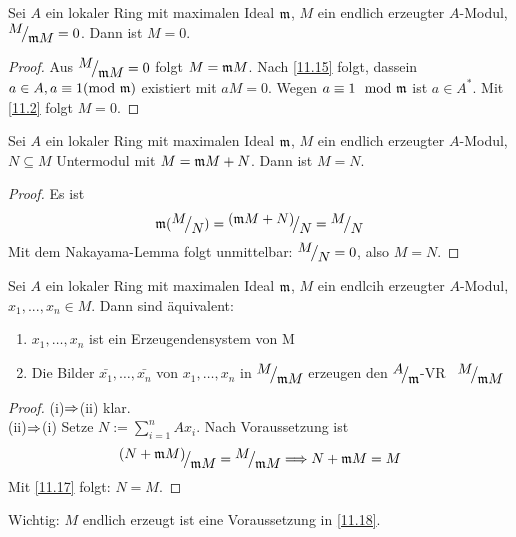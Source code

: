 \begin{sa} \label{11.16}
	Sei $ A $ ein lokaler Ring mit maximalen Ideal $\mathfrak{m}$, $M$ ein endlich erzeugter $A$-Modul, $ \QR{M}{\m M } = 0$. Dann ist $ M = 0$. 
\end{sa}
\begin{proof}
	 Aus $ \QR{M}{\m M } = 0$ folgt $M = \mathfrak{m} M$. Nach \ref{11.15} folgt, dassein $a \in A, a \equiv 1 (\text{mod} \ \mathfrak{m}) $ existiert mit $ aM = 0 $. Wegen  $a \equiv 1 \mod {\mathfrak{m}}$ ist $ a \in A^{*} $. Mit \ref{11.2} folgt $M = 0 $. 
\end{proof}
\begin{fo} \label{11.17}
	Sei $A$ ein lokaler Ring mit maximalen Ideal $ \mathfrak{m}$, $M$ ein endlich erzeugter $A$-Modul, $N \subseteq M $ Untermodul mit $ M = \mathfrak{m} M + N $. Dann ist $M = N $.
\end{fo}
\begin{proof}
	Es ist $$\m(\QR{M}{N}) = \QR{(\m M + N)}{N} = \QR{M}{N}$$
	Mit dem Nakayama-Lemma folgt unmittelbar: $\QR{M}{N} = 0$, also $ M = N. $
\end{proof}
\begin{fo} \label{11.18}
	Sei $A$ ein lokaler Ring mit maximalen Ideal $\mathfrak{m}$, $M$ ein endlcih erzeugter $A$-Modul, $x_1,...,x_n \in M $. Dann sind äquivalent: 
	\begin{enumerate} [label= \roman*)]
		\item $x_1, \dots ,x_n $ ist ein Erzeugendensystem von M 
		\item Die Bilder $ \bar{x_1},\dots ,\bar{x_n} $ von $x_1,\dots ,x_n$ in $\QR{M}{\m M } $ erzeugen den $\QR{A}{\m} $-VR \ $\QR{M}{\m M}$
	\end{enumerate}
\end{fo}
\begin{proof}
	(i)$\Rightarrow $(ii)  klar. \\
	(ii)$\Rightarrow$(i) Setze $N:= \sum_{i = 1}^{n} A x_i.$ Nach Voraussetzung ist $$ \QR{(N + \m M )}{\m M} = \QR{M}{\m M} \Longrightarrow N + \m M  = M$$
	Mit \ref{11.17} folgt: $N=M$.
\end{proof}
\begin{anm}
	Wichtig: $M$ endlich erzeugt ist eine Voraussetzung in \ref{11.18}.
\end{anm}
\newpage
